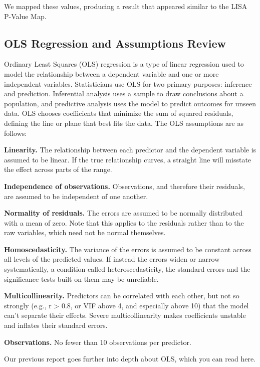 \documentclass[
  12pt,
]{article}
\begin{document}
We mapped these values, producing a result that appeared similar to the
LISA P-Value Map.

\subsection{OLS Regression and Assumptions
Review}\label{ols-regression-and-assumptions-review}

Ordinary Least Squares (OLS) regression is a type of linear regression
used to model the relationship between a dependent variable and one or
more independent variables. Statisticians use OLS for two primary
purposes: inference and prediction. Inferential analysis uses a sample
to draw conclusions about a population, and predictive analysis uses the
model to predict outcomes for unseen data. OLS chooses coefficients that
minimize the sum of squared residuals, defining the line or plane that
best fits the data. The OLS assumptions are as follows:

\textbf{Linearity.} The relationship between each predictor and the
dependent variable is assumed to be linear. If the true relationship
curves, a straight line will misstate the effect across parts of the
range.

\textbf{Independence of observations.} Observations, and therefore their
residuals, are assumed to be independent of one another.

\textbf{Normality of residuals.} The errors are assumed to be normally
distributed with a mean of zero. Note that this applies to the residuals
rather than to the raw variables, which need not be normal themselves.

\textbf{Homoscedasticity.} The variance of the errors is assumed to be
constant across all levels of the predicted values. If instead the
errors widen or narrow systematically, a condition called
heteroscedasticity, the standard errors and the significance tests built
on them may be unreliable.

\textbf{Multicollinearity.} Predictors can be correlated with each
other, but not so strongly (e.g., \textbar r\textbar{} \textgreater{}
0.8, or VIF above 4, and especially above 10) that the model can't
separate their effects. Severe multicollinearity makes coefficients
unstable and inflates their standard errors.

\textbf{Observations.} No fewer than 10 observations per predictor.

Our previous report goes further into depth about OLS, which you can
read here.
\end{document}
